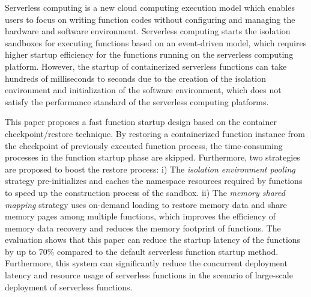 Serverless computing is a new cloud computing execution model which enables users to focus on writing function codes without configuring and managing the hardware and software environment. 
Serverless computing starts the isolation sandboxes for executing functions based on an event-driven model, 
which requires higher startup efficiency for the functions running on the serverless computing platform. 
However, the startup of containerized serverless functions can take hundreds of milliseconds to seconds due to the creation of the isolation environment and initialization of the software environment, which does not satisfy the performance standard of the serverless computing platforms.

This paper proposes a fast function startup design based on the container checkpoint/restore technique. 
By restoring a containerized function instance from the checkpoint of previously executed function process, the time-consuming processes in the function startup phase are skipped. 
Furthermore, two strategies are proposed to boost the restore process: 
i) The \textit{isolation environment pooling} strategy pre-initializes and caches the namespace resources required by functions to speed up the construction process of the sandbox. ii) The \textit{memory shared mapping} strategy uses on-demand loading to restore memory data and share memory pages among multiple functions, which improves the efficiency of memory data recovery and reduces the memory footprint of functions. The evaluation shows that this paper can reduce the startup latency of the functions by up to 70\% compared to the default serverless function startup method. Furthermore, this system can significantly reduce the concurrent deployment latency and resource usage of serverless functions in the scenario of large-scale deployment of serverless functions.